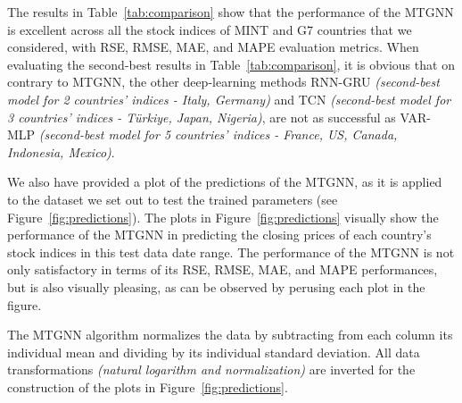 The results in Table~\ref{tab:comparison} show that the performance of the MTGNN is excellent across 
all the stock indices of MINT and G7 countries that we considered, with RSE, RMSE, MAE, and MAPE evaluation metrics. When evaluating the second-best results in Table~\ref{tab:comparison}, it is obvious that on contrary to MTGNN, the other deep-learning methods RNN-GRU \textit{(second-best model for 2 countries' indices - Italy, Germany)} and TCN \textit{(second-best model for 3 countries' indices - T\"{u}rkiye, Japan, Nigeria)}, are not as successful as VAR-MLP \textit{(second-best model for 5 countries' indices - France, US, Canada, Indonesia, Mexico)}.

We also have provided a plot of the predictions of the MTGNN, as it is applied to the dataset we set out 
to test the trained parameters (see Figure~\ref{fig:predictions}).  The plots in Figure~\ref{fig:predictions} visually show the 
performance of the MTGNN in predicting the closing prices of each country's stock indices in this test data date range. The performance of the MTGNN is not only satisfactory in terms of its RSE, RMSE, MAE, and MAPE performances, but is also visually pleasing, as can be observed by perusing each plot in the figure. 

\begin{rem}
The MTGNN algorithm normalizes the data by subtracting from each column its individual mean and dividing by its individual standard deviation. All data transformations \textit{(natural logarithm and normalization)} are inverted for the construction of the plots in Figure~\ref{fig:predictions}.
\end{rem}

